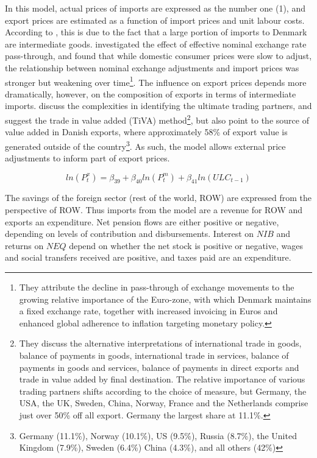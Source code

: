 \documentclass[
]{book}
\begin{document}
In this model, actual prices of imports are expressed as the number one (1),
and export prices are estimated as a function of import prices and unit labour costs.
According to \citet{byrialsenraza2019empirical}, this is due to the fact that a large portion
of imports to Denmark are intermediate goods. \citet{Kristoffersen2016} investigated the
effect of effective nominal exchange rate pass-through, and found that while domestic
consumer prices were slow to adjust, the relationship between nominal exchange adjustments
and import prices was stronger but weakening over time\footnote{They attribute the decline in
  pass-through of exchange movements to the growing relative importance of
  the Euro-zone, with which Denmark maintains a fixed exchange rate, together with
  increased invoicing in Euros and enhanced global adherence to inflation targeting
  monetary policy.}.
The influence on export prices depends more dramatically, however, on the
composition of exports in terms of intermediate imports. \citet{Bo2018} discuss the
complexities in identifying the ultimate trading partners, and suggest the trade
in value added (TiVA) method\footnote{They discuss the alternative interpretations of international trade
  in goods, balance of payments in goods, international trade in services, balance
  of payments in goods and services, balance of payments in direct exports and trade in
  value added by final destination. The relative importance of various trading partners
  shifts according to the choice of measure, but Germany, the USA, the UK, Sweden, China,
  Norway, France and the Netherlands comprise just over 50\% off all export. Germany the
  largest share at 11.1\%.}, but also point to the source of
value added in Danish exports, where approximately 58\% of export value is generated
outside of the country\footnote{Germany (11.1\%), Norway (10.1\%), US (9.5\%), Russia (8.7\%),
  the United Kingdom (7.9\%), Sweden (6.4\%) China (4.3\%), and all others (42\%)}. As such, the model allows external price
adjustments to inform part of export prices.

\begin{equation}
ln(P^x_t) = \beta _{39} + \beta _{40}ln(P^m_t) + \beta _{41}ln(ULC_{t-1})
\end{equation}

The savings of the foreign sector (rest of the world, ROW) are expressed from the perspective
of ROW. Thus imports from the model are a revenue for ROW and exports an expenditure.
Net pension flows are either positive or negative, depending on levels of contribution
and disbursements. Interest on \(NIB\) and returns on \(NEQ\) depend on whether the net stock is positive or
negative, wages and social transfers received are positive, and taxes paid are an expenditure.
\end{document}
